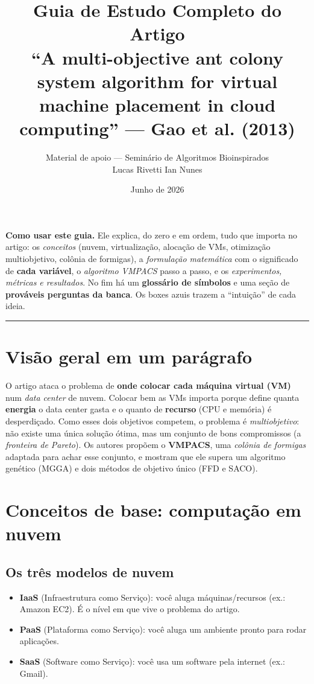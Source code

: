 \documentclass[11pt]{article}
\title{\textbf{Guia de Estudo Completo do Artigo}\\[3pt]
\large ``A multi-objective ant colony system algorithm for virtual machine
placement in cloud computing'' --- Gao et al. (2013)}
\author{Material de apoio --- Seminário de Algoritmos Bioinspirados\\
\small Lucas Rivetti \quad Ian Nunes}
\date{Junho de 2026}
\begin{document}
\maketitle
\begin{ideia}
\textbf{Como usar este guia.} Ele explica, do zero e em ordem, tudo que importa
no artigo: os \emph{conceitos} (nuvem, virtualização, alocação de VMs,
otimização multiobjetivo, colônia de formigas), a \emph{formulação matemática}
com o significado de \textbf{cada variável}, o \emph{algoritmo VMPACS} passo a
passo, e os \emph{experimentos, métricas e resultados}. No fim há um
\textbf{glossário de símbolos} e uma seção de \textbf{prováveis perguntas da
banca}. Os boxes azuis trazem a ``intuição'' de cada ideia.
\end{ideia}
\tableofcontents
\vspace{4pt}\hrule

\section{Visão geral em um parágrafo}
O artigo ataca o problema de \textbf{onde colocar cada máquina virtual (VM)} num
\emph{data center} de nuvem. Colocar bem as VMs importa porque define quanta
\textbf{energia} o data center gasta e o quanto de \textbf{recurso} (CPU e
memória) é desperdiçado. Como esses dois objetivos competem, o problema é
\emph{multiobjetivo}: não existe uma única solução ótima, mas um conjunto de bons
compromissos (a \emph{fronteira de Pareto}). Os autores propõem o \textbf{VMPACS},
uma \emph{colônia de formigas} adaptada para achar esse conjunto, e mostram que
ele supera um algoritmo genético (MGGA) e dois métodos de objetivo único (FFD e
SACO).

\section{Conceitos de base: computação em nuvem}
\subsection{Os três modelos de nuvem}
\begin{itemize}[leftmargin=1.4em,itemsep=2pt]
  \item \textbf{IaaS} (Infraestrutura como Serviço): você aluga máquinas/recursos
  (ex.: Amazon EC2). É o nível em que vive o problema do artigo.
  \item \textbf{PaaS} (Plataforma como Serviço): você aluga um ambiente pronto
  para rodar aplicações.
  \item \textbf{SaaS} (Software como Serviço): você usa um software pela internet
  (ex.: Gmail).
\end{itemize}
\end{document}
